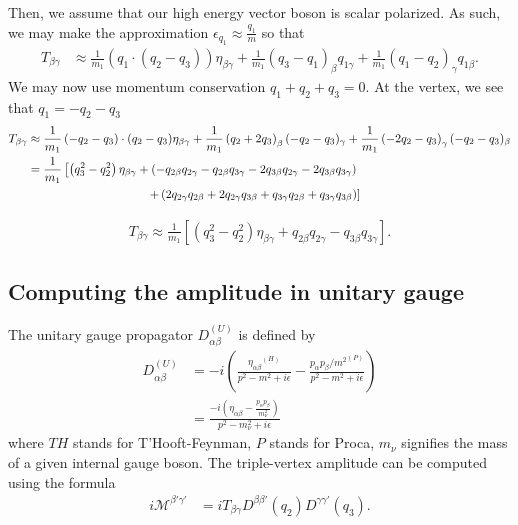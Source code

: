 \documentclass[12pt]{article}
\numberwithin{figure}{section}
\numberwithin{table}{section}
\newcommand{\paren}[1]{\left(#1\right)}
\newcommand{\bracket}[1]{\left[#1\right]}
\newcommand{\p}[1]{\left(#1\right)}
\begin{document}
Then, we assume that our high energy vector boson is scalar polarized. As such, we may make the approximation
$\epsilon_{q_1} \approx \frac{q_1}{m}$
so that
\begin{align*}
 T_{\beta\gamma}&\approx \frac{1}{m_1}\p{q_1\cdot(q_2-q_3)} \eta_{\beta\gamma} + \frac{1}{m_1}\p{q_3-q_1}_\beta q_{1\gamma} + \frac{1}{m_1}\p{q_1 -q_2}_\gamma q_{1\beta}.
\end{align*}
We may now use momentum conservation $q_1+q_2+q_3 = 0$. At the vertex, we see that $q_1 = -q_2-q_3$
\begin{align*}
 T_{\beta\gamma}&\approx  \frac{1}{m_{1}}\paren{-q_2-q_3}\cdot(q_2-q_3)\eta_{\beta\gamma} +\frac{1}{m_1}\paren{q_2+2q_3}_\beta (-q_2-q_3)_\gamma +\frac{1}{m_1}\paren{-2q_2-q_3}_\gamma (-q_2-q_3)_\beta\\
 &= \frac{1}{m_1} \left[ \paren{q_3^2-q_2^2}\eta_{\beta\gamma}+
\paren{-q_{2\beta} q_{2\gamma} -q_{2\beta}q_{3\gamma}  -2q_{3\beta}q_{2\gamma}-2q_{3\beta}q_{3\gamma}   } \right. \\
& \hspace{3.5cm}\left.+
\paren{ 2q_{2\gamma}q_{2\beta} + 2q_{2\gamma}  q_{3\beta}  +q_{3\gamma}q_{2\beta} + q_{3\gamma}q_{3\beta}}\right]
\end{align*}

\begin{align}
\label{eq:PolVertexTensor}
     T_{\beta\gamma}\approx  \boxed{\frac{1}{m_1}\bracket{\paren{q_3^2-q_2^2}\eta_{\beta\gamma} +q_{2\beta}q_{2\gamma}-q_{3\beta}q_{3\gamma} }}.
\end{align}
\subsection{Computing the amplitude in unitary gauge}
The unitary gauge propagator $ D_{\alpha\beta}^{(U)}$ is defined by
\begin{align}
 \label{eq:UnitaryPropagatorv1}
 D_{\alpha\beta}^{(U)}&= -i \p{{\frac{{\eta_{\alpha\beta}}^{(H)}}{p^2-m^2+i\epsilon}}-\frac{{p_\alpha p_\beta/m^2}^{(P)}}{p^2-m^2+i\epsilon}}\\
 \label{eq:UnitaryPropagatorv2}
 &= \frac{-i\p{\eta_{\alpha\beta}-\frac{p_\alpha p_\beta}{m_\nu^2}}}{p^2-m_\nu^2+i\epsilon}
\end{align}
where $TH$ stands for T'Hooft-Feynman, $P$ stands for Proca, $m_\nu$ signifies the mass of a given internal gauge boson.
The triple-vertex amplitude can be computed using the formula
\begin{align}
\label{eq:VertexAmplitude}
i \mathcal{M}^{\beta'\gamma'}&=iT_{\beta\gamma} D^{\beta\beta'}(q_2)D^{\gamma\gamma'}(q_3) .
\end{align}
\end{document}

